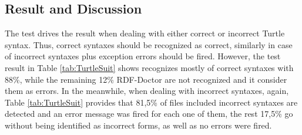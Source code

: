 \subsection{Result and Discussion}

The test drives the result when dealing with either correct or incorrect Turtle syntax. Thus, correct syntaxes should be recognized as correct, similarly in case of incorrect syntaxes plus exception errors should be fired.  However,  the test result in Table \ref{tab:TurtleSuit} shows recognizes mostly of correct syntaxes with 88\%, while the remaining 12\% RDF-Doctor are not recognized and it consider them as errors. In the meanwhile, when dealing with incorrect syntaxes, again, Table \ref{tab:TurtleSuit} provides that 81,5\% of files included incorrect syntaxes are detected and an error message was fired for each one of them, the rest 17,5\% go without being identified as incorrect forms, as well as no errors were fired.



